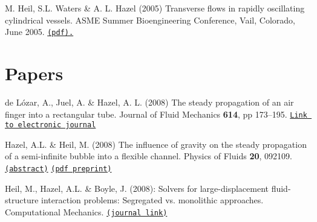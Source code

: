 \begin{DoxyItemize}
\item M. Heil, S.\-L. Waters \& A. L. Hazel (2005) Transverse flows in rapidly oscillating cylindrical vessels. A\-S\-M\-E Summer Bioengineering Conference, Vail, Colorado, June 2005. \href{http://www.maths.man.ac.uk/~mheil/oomph_lib_additional_material/ASME_talk_vail_2005/ASME_talk_2005.pdf}{\tt (pdf).}
\end{DoxyItemize}


\begin{DoxyItemize}
\item 
\end{DoxyItemize}



 

\hypertarget{index_papers}{}\section{Papers}\label{index_papers}

\begin{DoxyItemize}
\item de L\'{o}zar, A., Juel, A. \& Hazel, A. L. (2008) The steady propagation of an air finger into a rectangular tube. Journal of Fluid Mechanics {\bfseries  614}, pp 173--195. \href{http://journals.cambridge.org/action/displayAbstract?fromPage=online&aid=2459772&fulltextType=RA&fileId=S0022112008003455}{\tt Link to electronic journal}
\end{DoxyItemize}


\begin{DoxyItemize}
\item Hazel, A.\-L. \& Heil, M. (2008) The influence of gravity on the steady propagation of a semi-\/infinite bubble into a flexible channel. Physics of Fluids {\bfseries 20}, 092109. \href{http://www.maths.man.ac.uk/~mheil/MATTHIAS/ABSTRACTS/HazelHeilPoF2007.html}{\tt (abstract)} \href{http://www.maths.man.ac.uk/~mheil/MATTHIAS/PDF/HazelHeilPoF2008.pdf}{\tt (pdf preprint)}
\end{DoxyItemize}


\begin{DoxyItemize}
\item Heil, M., Hazel, A.\-L. \& Boyle, J. (2008)\-: Solvers for large-\/displacement fluid-\/structure interaction problems\-: Segregated vs. monolithic approaches. Computational Mechanics. \href{http://www.springerlink.com/content/m3r6318701g338g4/}{\tt (journal link)}
\end{DoxyItemize}


